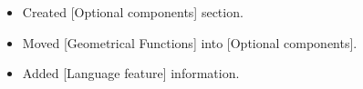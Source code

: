 \documentclass[11pt,a4paper]{ivoa}
\begin{document}
\begin{itemize}
\begin{itemize}
        \end{itemize}

    \item Created [Optional components] section.
    \item Moved [Geometrical Functions] into [Optional components].
    \item Added [Language feature] information.

\end{itemize}


\end{document}
